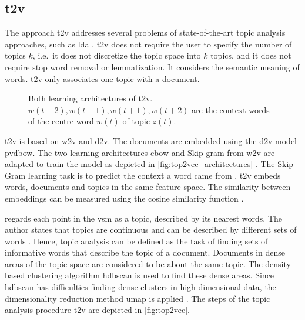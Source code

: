 \subsection{\acl*{t2v}}\label{subsec:top2vec}

The approach \acf{t2v} addresses several problems of state-of-the-art topic analysis approaches, such as \ac{lda} \cite{Top2Vec2020}.
\ac{t2v} does not require the user to specify the number of topics $k$, 
i.e.\ it does not discretize the topic space into $k$ topics, 
and it does not require stop word removal or lemmatization.
It considers the semantic meaning of words.
\ac{t2v} only associates one topic with a document.

\begin{figure}[!htb]%
    \centering
    \qquad
    \caption[Two learning architectures of \acs*{t2v}]{Both learning architectures of \acs*{t2v}.
    $w(t-2), w(t-1), w(t+1), w(t+2)$ are the context words of the centre word $w(t)$ of topic $z(t)$.
    }%
    \label{fig:top2vec_architectures}%
\end{figure}

\ac{t2v} is based on \ac{w2v} and \ac{d2v}.
The documents are embedded using the \ac{d2v} model \ac{pvdbow}.
The two learning architectures \ac{cbow} and Skip-gram from \ac{w2v} are adapted to train the model as depicted in \autoref{fig:top2vec_architectures} \cite{Topic2Vec2015}.
The Skip-Gram learning task is to predict the context a word came from \cite{Top2Vec2020, Topic2Vec2015}.
\ac{t2v} embeds words, documents and topics in the same feature space.
The similarity between embeddings can be measured using the cosine similarity function \cite{Topic2Vec2015}.

\citeauthor{Top2Vec2020} regards each point in the \ac{vsm} as a topic, described by its nearest words.
The author states that topics are continuous and can be described by different sets of words \cite{Top2Vec2020}.
Hence, topic analysis can be defined as the task of finding sets of informative words that describe the topic of a document.
Documents in dense areas of the topic space are considered to be about the same topic.
The density-based clustering algorithm \ac{hdbscan} is used to find these dense areas.
Since \ac{hdbscan} has difficulties finding dense clusters in high-dimensional data, 
the dimensionality reduction method \ac{umap} is applied \cite{Top2Vec2020}.
The steps of the topic analysis procedure \ac{t2v} are depicted in \autoref{fig:top2vec}.

